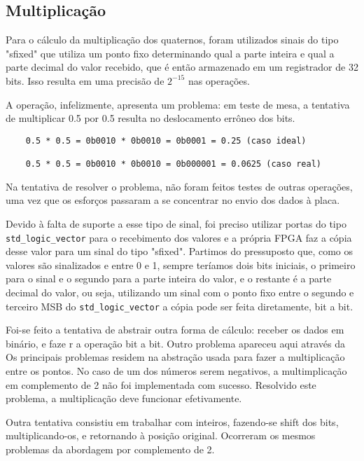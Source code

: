 \documentclass [12pt,oneside] {article}
\begin{document}
\subsection{Multiplicação}

	Para o cálculo da multiplicação dos quaternos, foram
utilizados sinais do tipo "sfixed" que utiliza um ponto fixo
determinando qual a parte inteira e qual a parte decimal do valor
recebido, que é então armazenado em um registrador de 32 bits. Isso
resulta em uma precisão de $2^{-15}$ nas operações.

	A operação, infelizmente, apresenta um problema: em teste de
mesa, a tentativa de multiplicar 0.5 por 0.5 resulta no deslocamento
errôneo dos bits.

\begin{footnotesize}
\begin{verbatim}
	0.5 * 0.5 = 0b0010 * 0b0010 = 0b0001 = 0.25 (caso ideal)

	0.5 * 0.5 = 0b0010 * 0b0010 = 0b000001 = 0.0625 (caso real)
\end{verbatim}
\end{footnotesize}

Na tentativa de resolver o problema, não foram feitos testes de outras
operações, uma vez que os esforços passaram a se concentrar no envio
dos dados à placa.

	Devido à falta de suporte a esse tipo de sinal, foi preciso
utilizar portas do tipo \texttt{std\_logic\_vector} para o recebimento dos
valores e a própria FPGA faz a cópia desse valor para um sinal do tipo
"sfixed". Partimos do pressuposto que, como os valores são sinalizados
e entre 0 e 1, sempre teríamos dois bits iniciais, o primeiro para o
sinal e o segundo para a parte inteira do valor, e o restante é a
parte decimal do valor, ou seja, utilizando um sinal com o ponto fixo
entre o segundo e terceiro MSB do \texttt{std\_logic\_vector} a cópia pode ser
feita diretamente, bit a bit.

	Foi-se feito a tentativa de abstrair outra forma de cálculo:
receber os dados em binário, e faze r a operação bit a bit. Outro
problema apareceu aqui através da  Os principais problemas residem na
abstração usada para fazer a multiplicação entre os pontos. No caso de
um dos números serem negativos, a multimplicação em complemento de 2
não foi implementada com sucesso. Resolvido este problema, a
multiplicação deve funcionar efetivamente.

	Outra tentativa consistiu em trabalhar com inteiros,
fazendo-se shift dos bits, multiplicando-os, e retornando à posição
original. Ocorreram os mesmos problemas da abordagem por complemento
de 2.
\end{document}
